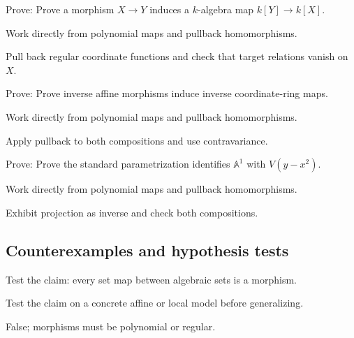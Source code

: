 \begin{exercise}[Contravariance]\label{exr:vi04-expand-07}
Prove: Prove a morphism $X\to Y$ induces a $k$-algebra map $k[Y]\to k[X]$.
\end{exercise}
\begin{hint}
Work directly from polynomial maps and pullback homomorphisms.
\end{hint}
\begin{solution}
Pull back regular coordinate functions and check that target relations vanish on $X$.
\end{solution}

\begin{exercise}\label{exr:vi04-expand-08}
Prove: Prove inverse affine morphisms induce inverse coordinate-ring maps.
\end{exercise}
\begin{hint}
Work directly from polynomial maps and pullback homomorphisms.
\end{hint}
\begin{solution}
Apply pullback to both compositions and use contravariance.
\end{solution}

\begin{exercise}\label{exr:vi04-expand-09}
Prove: Prove the standard parametrization identifies $\mathbb A^1$ with $V(y-x^2)$.
\end{exercise}
\begin{hint}
Work directly from polynomial maps and pullback homomorphisms.
\end{hint}
\begin{solution}
Exhibit projection as inverse and check both compositions.
\end{solution}

\subsection*{Counterexamples and hypothesis tests}

\begin{exercise}\label{exr:vi04-expand-10}
Test the claim: every set map between algebraic sets is a morphism.
\end{exercise}
\begin{hint}
Test the claim on a concrete affine or local model before generalizing.
\end{hint}
\begin{solution}
False; morphisms must be polynomial or regular.
\end{solution}

